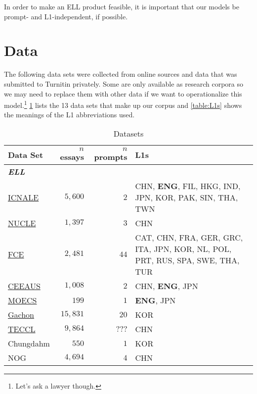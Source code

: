 \documentclass[12pt]{article}
\begin{document}
In order to make an ELL product feasible, it is important that our models be
prompt- and L1-independent, if possible.

\section*{Data}
The following data sets were collected from online sources and data that was
submitted to Turnitin privately. Some are only available
as research corpora so we may need to replace them with other data if we want
to operationalize this model.\footnote{Let's ask a lawyer though.} \ref{table:datasets}
lists the 13 data sets that make up our corpus and \ref{table:L1s} shows the
meanings of the L1 abbreviations used.

\begin {table}
\caption {Datasets}
\label{table:datasets}
\begin{center}
\begin{tabularx}{\textwidth}{l r r X}
Data Set & $n$ essays & $n$ prompts & L1s \\
\hline
\textbf{\textit{ELL}} \\
\hline
\href{http://language.sakura.ne.jp/icnale/}{ICNALE} & $5,600$ & $2$ & CHN, \textbf{ENG}, FIL, HKG, IND, JPN, \newline KOR, PAK, SIN, THA, TWN \\
\href{http://www.comp.nus.edu.sg/~nlp/conll14st.html\#nucle32}{NUCLE} & $1,397$ & $3$ & CHN \\
\href{http://ilexir.co.uk/datasets/index.html}{FCE} & $2,481$ & $44$ & CAT, CHN, FRA, GER, GRC, ITA, \newline JPN, KOR, NL, POL, PRT, RUS, \newline SPA, SWE, THA, TUR \\
\href{https://meta-toolkit.org/data/2016-01-26/ceeaus.tar.gz}{CEEAUS} & $1,008$ & $2$ & CHN, \textbf{ENG}, JPN \\
\href{http://www.u-sacred-heart.ac.jp/okugiri/links/moecs/links/data/data.html}{MOECS} & $199$ & $1$ & \textbf{ENG}, JPN \\
\href{http://koreanlearnercorpusblog.blogspot.be/p/corpus.html}{Gachon} & $15,831$ & $20$ & KOR \\
\href{http://www.bfsu-corpus.org/static/corpora/TECCL_Corpus_V1.1.zip}{TECCL} & $9,864$ & $???$ & CHN \\
Chungdahm & $550$ & $1$ & KOR \\
NOG & $4,694$ & $4$ & CHN \\

\end{tabularx}
\end{center}
\end{table}
\end{document}
